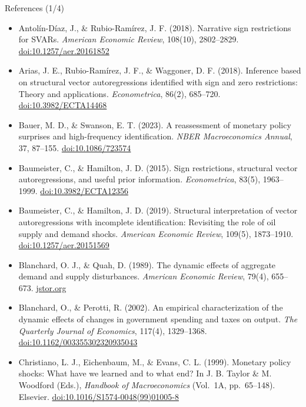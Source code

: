 \begin{frame}{References (1/4)}
\itemsize{\tiny}
\begin{itemize}
    \item Antolín-Díaz, J., \& Rubio-Ramírez, J. F. (2018). Narrative sign restrictions for SVARs. \textit{American Economic Review}, 108(10), 2802--2829. \href{https://doi.org/10.1257/aer.20161852}{doi:10.1257/aer.20161852}
    \item Arias, J. E., Rubio-Ramírez, J. F., \& Waggoner, D. F. (2018). Inference based on structural vector autoregressions identified with sign and zero restrictions: Theory and applications. \textit{Econometrica}, 86(2), 685--720. \href{https://doi.org/10.3982/ECTA14468}{doi:10.3982/ECTA14468}
    \item Bauer, M. D., \& Swanson, E. T. (2023). A reassessment of monetary policy surprises and high-frequency identification. \textit{NBER Macroeconomics Annual}, 37, 87--155. \href{https://doi.org/10.1086/723574}{doi:10.1086/723574}
    \item Baumeister, C., \& Hamilton, J. D. (2015). Sign restrictions, structural vector autoregressions, and useful prior information. \textit{Econometrica}, 83(5), 1963--1999. \href{https://doi.org/10.3982/ECTA12356}{doi:10.3982/ECTA12356}
    \item Baumeister, C., \& Hamilton, J. D. (2019). Structural interpretation of vector autoregressions with incomplete identification: Revisiting the role of oil supply and demand shocks. \textit{American Economic Review}, 109(5), 1873--1910. \href{https://doi.org/10.1257/aer.20151569}{doi:10.1257/aer.20151569}
    \item Blanchard, O. J., \& Quah, D. (1989). The dynamic effects of aggregate demand and supply disturbances. \textit{American Economic Review}, 79(4), 655--673. \href{https://www.jstor.org/stable/1827924}{jstor.org}
    \item Blanchard, O., \& Perotti, R. (2002). An empirical characterization of the dynamic effects of changes in government spending and taxes on output. \textit{The Quarterly Journal of Economics}, 117(4), 1329--1368. \href{https://doi.org/10.1162/003355302320935043}{doi:10.1162/003355302320935043}
    \item Christiano, L. J., Eichenbaum, M., \& Evans, C. L. (1999). Monetary policy shocks: What have we learned and to what end? In J. B. Taylor \& M. Woodford (Eds.), \textit{Handbook of Macroeconomics} (Vol.\ 1A, pp.\ 65--148). Elsevier. \href{https://doi.org/10.1016/S1574-0048(99)01005-8}{doi:10.1016/S1574-0048(99)01005-8}

\end{itemize}
\end{frame}
